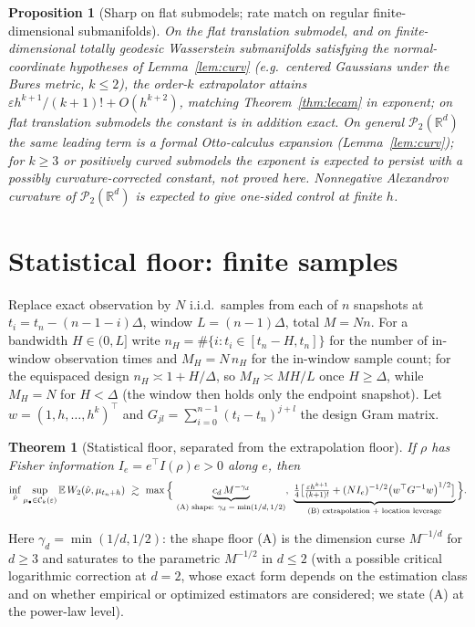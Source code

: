 \documentclass[11pt]{article}
\newtheorem{theorem}{Theorem}
\newtheorem{proposition}{Proposition}
\theoremstyle{definition}
\theoremstyle{remark}
\newcommand{\R}{\mathbb{R}}
\newcommand{\E}{\mathbb{E}}
\newcommand{\PP}{\mathcal{P}_2(\R^d)}
\newcommand{\Ck}{\mathcal{C}_k(\varepsilon)}
\begin{document}
\begin{proposition}[Sharp on flat submodels; rate match on regular finite-dimensional submanifolds]\label{prop:sharp}
On the flat translation submodel, and on finite-dimensional totally geodesic Wasserstein
submanifolds satisfying the normal-coordinate hypotheses of Lemma~\ref{lem:curv} (e.g.\ centered
Gaussians under the Bures metric, $k\le 2$), the order-$k$ extrapolator attains
$\varepsilon h^{k+1}/(k+1)!+O(h^{k+2})$, matching Theorem~\ref{thm:lecam} in exponent; on flat
translation submodels the constant is in addition exact. On general $\PP$ the same leading term is
a \emph{formal} Otto-calculus expansion (Lemma~\ref{lem:curv}); for $k\ge 3$ or positively curved
submodels the exponent is expected to persist with a possibly curvature-corrected constant, not
proved here. Nonnegative Alexandrov curvature of $\PP$ is expected to give one-sided control at
finite $h$.
\end{proposition}

\section{Statistical floor: finite samples}\label{sec:stat}

Replace exact observation by $N$ i.i.d.\ samples from each of $n$ snapshots at
$t_i=t_n-(n-1-i)\Delta$, window $L=(n-1)\Delta$, total $M=Nn$. For a bandwidth $H\in(0,L]$ write
$n_H=\#\{i:t_i\in[t_n-H,t_n]\}$ for the number of in-window observation times and $M_H=N\,n_H$ for the
in-window sample count; for the equispaced design $n_H\asymp1+H/\Delta$, so $M_H\asymp MH/L$ once
$H\ge\Delta$, while $M_H=N$ for $H<\Delta$ (the window then holds only the endpoint snapshot). Let
$w=(1,h,\dots,h^k)^\top$
and $G_{jl}=\sum_{i=0}^{n-1}(t_i-t_n)^{j+l}$ the design Gram matrix.

\begin{theorem}[Statistical floor, separated from the extrapolation floor]\label{thm:stat}
If $\rho$ has Fisher information $I_e=e^\top I(\rho)e>0$ along $e$, then
\[
  \inf_{\hat\nu}\sup_{\mu_\bullet\in\Ck}\E\,W_2(\hat\nu,\mu_{t_n+h})
  \ \gtrsim\
  \max\Big\{\,
   \underbrace{c_d\,M^{-\gamma_d}}_{\textup{(A) shape: $\gamma_d=\min(1/d,1/2)$}}
   ,\
   \underbrace{\tfrac14\big[\tfrac{\varepsilon h^{k+1}}{(k+1)!}
   +(N I_e)^{-1/2}\big(w^\top G^{-1}w\big)^{1/2}\big]}_{\textup{(B) extrapolation + location leverage}}
   \Big\}.
\]
\end{theorem}

\noindent Here $\gamma_d=\min(1/d,1/2)$: the shape floor (A) is the dimension curse $M^{-1/d}$ for
$d\ge3$ and saturates to the parametric $M^{-1/2}$ in $d\le2$ (with a possible critical logarithmic
correction at $d=2$, whose exact form depends on the estimation class and on whether empirical or
optimized estimators are considered; we state (A) at the power-law level).
\end{document}
